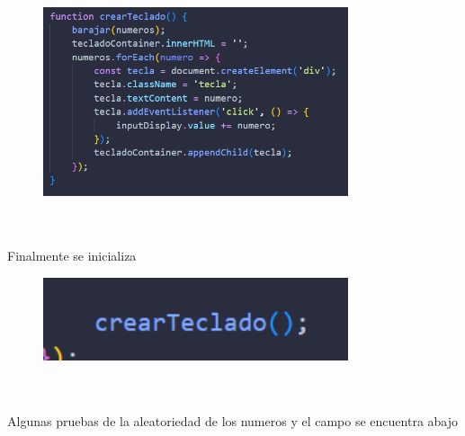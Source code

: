 \documentclass{article}
\begin{document}
    \begin{figure}[H]
		          \centering
		          \includegraphics[width=0.8\textwidth,keepaspectratio]                       {img/crearTeclado.png}
    \end{figure}
\\
\\Finalmente se inicializa

    \begin{figure}[H]
		          \centering
		          \includegraphics[width=0.8\textwidth,keepaspectratio]                       {img/iniciaTeclado.png}
    \end{figure}

\\
\\Algunas pruebas de la aleatoriedad de los numeros y el campo se encuentra abajo
\end{document}
